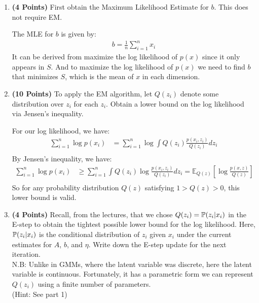 \begin{enumerate}
\item \textbf{(4 Points)}
First obtain the Maximum Likelihood Estimate for $b$. This does not require EM.

\begin{soln}
  The MLE for $b$ is given by:
  \begin{align*}
    b = \frac{1}{n} \sum_{i=1}^n x_i
  \end{align*}
  It can be derived from maximize the log likelihood of $p(x)$ since it only appears in $S$. And to maximize the log likelihood of $p(x)$ we need to find $b$ that minimizes $S$, which is the mean of $x$ in each dimension.
\end{soln}

\item \textbf{(10 Points)}
To apply the EM algorithm,
let $Q(z_i)$  denote some distribution over $z_i$ for each $z_i$.
Obtain a lower bound on the log likelihood via Jensen's inequality.

\begin{soln}
  For our log likelihood, we have:
  \begin{align*}
    \sum_{i=1}^n \log p(x_i) &= \sum_{i=1}^n \log \int Q(z_i) \frac{p(x_i, z_i)}{Q(z_i)} dz_i \\
  \end{align*}
  By Jensen's inequality, we have:
  \begin{align*}
    \sum_{i=1}^n \log p(x_i) &\geq \sum_{i=1}^n \int Q(z_i) \log \frac{p(x_i, z_i)}{Q(z_i)} dz_i = \mathbb{E}_{Q(z)} \left[ \log \frac{p(x, z)}{Q(z)} \right] \\
  \end{align*}
  So for any probability distribution $Q(z)$ satisfying $1 > Q(z) > 0$, this lower bound is valid.
\end{soln}

\item \textbf{(4 Points)}
Recall, from the lectures, that we chose
$Q(z_i) =  \mathbb{P}(z_i|x_i)$ in the E-step to obtain the tightest
possible lower bound for the log likelihood.
Here, $ \mathbb{P}(z_i|x_i)$ is the conditional distribution of $z_i$
given $x_i$ under the current estimates for $A$, $b$, and $\eta$.
Write down the E-step update for the next iteration. \\
N.B: Unlike in GMMs, where the latent variable was discrete, here the latent variable is continuous. Fortunately, it has a parametric form we can represent $Q(z_i)$ using a finite number of parameters. \\
(Hint: See part 1)


\end{enumerate}
